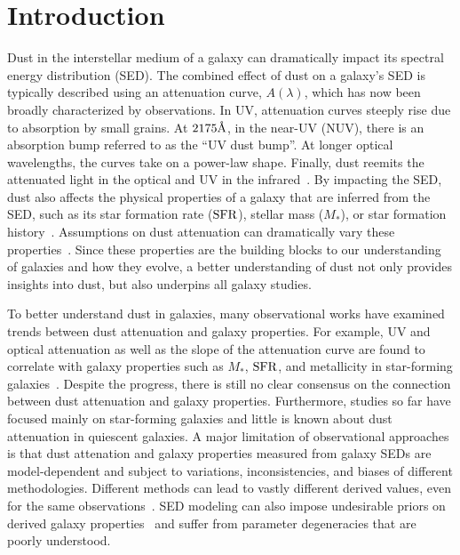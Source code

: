 \section{Introduction} \label{sec:intro} 
Dust in the interstellar medium of a galaxy can dramatically impact its
spectral energy distribution (SED). %
The combined effect of dust on a galaxy's SED is typically described using
an attenuation curve, $A(\lambda)$, which has now been broadly characterized 
by observations. 
In UV, attenuation curves steeply rise due to absorption by small grains.
At $2175\AA$, in the near-UV (NUV), there is an absorption bump referred to as
the ``UV dust bump''. 
At longer optical wavelengths, the curves take on a power-law shape. 
Finally, dust reemits the attenuated light in the optical and UV in the
infrared~\citep[for an overview see][]{calzetti2001, draine2003,
galliano2018}.
By impacting the SED, dust also affects the physical properties of a galaxy
that are inferred from the SED, such as its star formation rate (${\rm SFR}$),
stellar mass ($M_*$), or star formation history~\citep[see reviews by][]{walcher2011,
conroy2013}. 
Assumptions on dust attenuation can dramatically vary these
properties~\citep{kriek2013, reddy2015, salim2016, salim2020}.
Since these properties are the building blocks to our understanding of
galaxies and how they evolve, a better understanding of dust not only provides
insights into dust, but also underpins all galaxy studies.  

To better understand dust in galaxies, many observational works have
examined trends between dust attenuation and galaxy properties.
For example, UV and optical attenuation as well as the slope of the attenuation
curve are found to correlate with galaxy properties such as $M_*$, ${\rm SFR}$, and
metallicity in star-forming galaxies~\citep[][for a recent review see
\citealt{salim2020}]{garn2010, wild2011, battisti2016, battisti2017}. 
Despite the progress, there is still no clear consensus on the connection
between dust attenuation and galaxy properties.
Furthermore, studies so far have focused mainly on star-forming galaxies and
little is known about dust attenuation in quiescent galaxies. 
A major limitation of observational approaches is that dust attenation and
galaxy properties measured from galaxy SEDs are model-dependent and subject to
variations, inconsistencies, and biases of different methodologies.
Different methods can lead to vastly different derived values, even for the
same observations~\citep[\eg][see also Appendix~\ref{sec:slab}]{speagle2014, katsianis2020}.
SED modeling can also impose undesirable priors on derived galaxy
properties~\citep{carnall2018, leja2019} and suffer from parameter degeneracies
that are poorly understood. 

